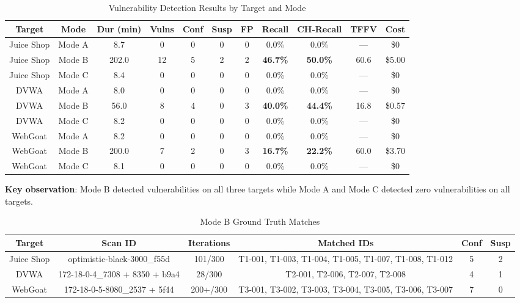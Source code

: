 \documentclass[12pt,a4paper,oneside]{book}
\begin{document}
\begin{table}[h]
\centering
\caption{Vulnerability Detection Results by Target and Mode}
\label{tab:per_target_results}
\begin{tabular}{|c|c|c|c|c|c|c|c|c|c|c|}
\hline
\textbf{Target} & \textbf{Mode} & \textbf{Dur (min)} & \textbf{Vulns} & \textbf{Conf} & \textbf{Susp} & \textbf{FP} & \textbf{Recall} & \textbf{CH-Recall} & \textbf{TFFV} & \textbf{Cost} \\ \hline
Juice Shop & Mode A & 8.7 & 0 & 0 & 0 & 0 & 0.0\% & 0.0\% & — & \$0 \\ \hline
Juice Shop & Mode B & 202.0 & 12 & 5 & 2 & 2 & \textbf{46.7\%} & \textbf{50.0\%} & 60.6 & \$5.00 \\ \hline
Juice Shop & Mode C & 8.4 & 0 & 0 & 0 & 0 & 0.0\% & 0.0\% & — & \$0 \\ \hline
DVWA & Mode A & 8.0 & 0 & 0 & 0 & 0 & 0.0\% & 0.0\% & — & \$0 \\ \hline
DVWA & Mode B & 56.0 & 8 & 4 & 0 & 3 & \textbf{40.0\%} & \textbf{44.4\%} & 16.8 & \$0.57 \\ \hline
DVWA & Mode C & 8.2 & 0 & 0 & 0 & 0 & 0.0\% & 0.0\% & — & \$0 \\ \hline
WebGoat & Mode A & 8.2 & 0 & 0 & 0 & 0 & 0.0\% & 0.0\% & — & \$0 \\ \hline
WebGoat & Mode B & 200.0 & 7 & 2 & 0 & 3 & \textbf{16.7\%} & \textbf{22.2\%} & 60.0 & \$3.70 \\ \hline
WebGoat & Mode C & 8.1 & 0 & 0 & 0 & 0 & 0.0\% & 0.0\% & — & \$0 \\ \hline
\end{tabular}
\end{table}

\textbf{Key observation}: Mode B detected vulnerabilities on all three targets while Mode A and Mode C detected zero vulnerabilities on all targets.

\begin{table}[h]
\centering
\caption{Mode B Ground Truth Matches}
\label{tab:mode_b_matches}
\begin{tabular}{|c|c|c|c|c|c|}
\hline
\textbf{Target} & \textbf{Scan ID} & \textbf{Iterations} & \textbf{Matched IDs} & \textbf{Conf} & \textbf{Susp} \\ \hline
Juice Shop & optimistic-black-3000\_f55d & 101/300 & T1-001, T1-003, T1-004, T1-005, T1-007, T1-008, T1-012 & 5 & 2 \\ \hline
DVWA & 172-18-0-4\_7308 + 8350 + b9a4 & 28/300 & T2-001, T2-006, T2-007, T2-008 & 4 & 1 \\ \hline
WebGoat & 172-18-0-5-8080\_2537 + 5f44 & 200+/300 & T3-001, T3-002, T3-003, T3-004, T3-005, T3-006, T3-007 & 7 & 0 \\ \hline
\end{tabular}
\end{table}
\end{document}
